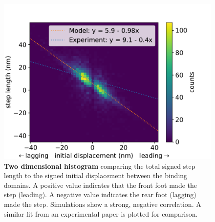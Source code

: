 \documentclass[12pt]{article}
\begin{document}
\begin{figure}[!hbt]
  \centering
  \includegraphics[width=0.75\columnwidth]{paper_displacement_vs_step_length}
  \caption{\textbf{Two dimensional histogram} comparing the total signed step length to
  the signed initial displacement between the binding domains. A positive value
  indicates that the front foot made the step (leading). A negative value
  indicates the rear foot (lagging) made the step. Simulations show a strong,
  negative correlation. A similar fit from an experimental paper is plotted for comparison.}
\end{figure}
\end{document}
